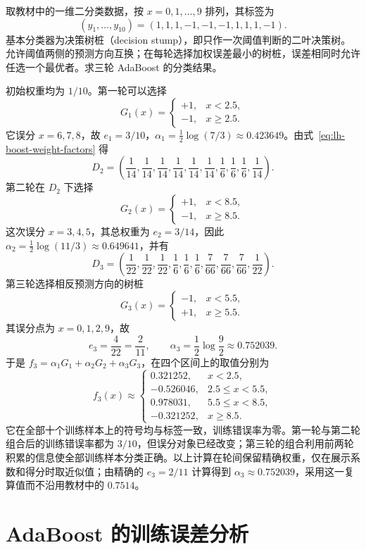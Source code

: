 \begin{example}
\label{ex:lh-boost-stumps}
取教材中的一维二分类数据，按 $x=0,1,\ldots,9$ 排列，其标签为
\[
 (y_1,\ldots,y_{10})=(1,1,1,-1,-1,-1,1,1,1,-1).
\]
基本分类器为决策树桩（decision stump），即只作一次阈值判断的二叶决策树。允许阈值两侧的预测方向互换；在每轮选择加权误差最小的树桩，误差相同时允许任选一个最优者。求三轮 AdaBoost 的分类结果。
\end{example}
\begin{solve}
初始权重均为 $1/10$。第一轮可以选择
\[
 G_1(x)=\begin{cases}+1,&x<2.5,\\-1,&x\geq2.5.\end{cases}
\]
它误分 $x=6,7,8$，故 $e_1=3/10$，$\alpha_1=\tfrac12\log(7/3)\approx0.423649$。由式~\eqref{eq:lh-boost-weight-factors} 得
\[
 D_2=\left(\frac1{14},\frac1{14},\frac1{14},\frac1{14},\frac1{14},\frac1{14},
            \frac16,\frac16,\frac16,\frac1{14}\right).
\]
第二轮在 $D_2$ 下选择
\[
 G_2(x)=\begin{cases}+1,&x<8.5,\\-1,&x\geq8.5.\end{cases}
\]
这次误分 $x=3,4,5$，其总权重为 $e_2=3/14$，因此 $\alpha_2=\tfrac12\log(11/3)\approx0.649641$，并有
\[
 D_3=\left(\frac1{22},\frac1{22},\frac1{22},\frac16,\frac16,\frac16,
            \frac7{66},\frac7{66},\frac7{66},\frac1{22}\right).
\]
第三轮选择相反预测方向的树桩
\[
 G_3(x)=\begin{cases}-1,&x<5.5,\\+1,&x\geq5.5.\end{cases}
\]
其误分点为 $x=0,1,2,9$，故
\[
 e_3=\frac4{22}=\frac2{11},\qquad
 \alpha_3=\frac12\log\frac92\approx0.752039.
\]
于是 $f_3=\alpha_1G_1+\alpha_2G_2+\alpha_3G_3$，在四个区间上的取值分别为
\[
 f_3(x)\approx
 \begin{cases}
  0.321252,&x<2.5,\\
  -0.526046,&2.5\leq x<5.5,\\
  0.978031,&5.5\leq x<8.5,\\
  -0.321252,&x\geq8.5.
 \end{cases}
\]
它在全部十个训练样本上的符号均与标签一致，训练错误率为零。第一轮与第二轮组合后的训练错误率都为 $3/10$，但误分对象已经改变；第三轮的组合利用前两轮积累的信息使全部训练样本分类正确。以上计算在轮间保留精确权重，仅在展示系数和得分时取近似值；由精确的 $e_3=2/11$ 计算得到 $\alpha_3\approx0.752039$，采用这一复算值而不沿用教材中的 $0.7514$。
\end{solve}

\section{AdaBoost 的训练误差分析}
\label{sec:lh-boost-training-error}

